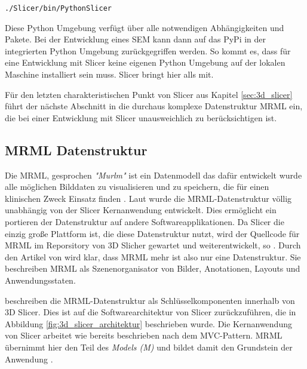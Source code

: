 \begin{center}
	\texttt{./Slicer/bin/PythonSlicer}
\end{center}

Diese Python Umgebung verfügt über alle notwendigen Abhängigkeiten und Pakete.
Bei der Entwicklung eines \ac{SEM} kann dann auf das \ac{PyPi} in der
integrierten Python Umgebung zurückgegriffen werden. So kommt es, dass für eine
Entwicklung mit Slicer keine eigenen Python Umgebung auf der lokalen Maschine
installiert sein muss. Slicer bringt hier alls mit.

Für den letzten charakteristischen Punkt von Slicer aus Kapitel \ref{sec:3d_slicer}
führt der nächste Abschnitt in die durchaus komplexe Datenstruktur \ac{MRML} ein,
die bei einer Entwicklung mit Slicer unausweichlich zu berücksichtigen ist.

\subsection{MRML Datenstruktur}
\label{subsec:mrml_datenstruktur} Die \ac{MRML}, gesprochen \textit{"Murlm"} ist
ein Datenmodell das dafür entwickelt wurde alle möglichen Bilddaten zu
visualisieren und zu speichern, die für einen klinischen Zweck Einsatz finden \citep[vgl.][]{slicer2024}.
Laut \citet{slicer2024} wurde die \ac{MRML}-Datenstruktur völlig unabhängig von der
Slicer Kernanwendung entwickelt. Dies ermöglicht ein portieren der Datenstruktur
auf andere Softwareapplikationen. Da Slicer die einzig große Plattform ist, die
diese Datenstruktur nutzt, wird der Quellcode für \ac{MRML} im Reporsitory von
3D Slicher gewartet und weiterentwickelt, so \citet{slicer2024}. Durch den Artikel
von \citet[Seite 1327]{fedorov2012slicer} wird klar, dass \ac{MRML} mehr ist also
nur eine Datenstruktur. Sie beschreiben \ac{MRML} als Szenenorganisator von Bilder,
Anotationen, Layouts und Anwendungsstaten.

\citet[Seite 1331]{fedorov2012slicer} beschreiben die \ac{MRML}-Datenstruktur
als Schlüsselkomponenten innerhalb von 3D Slicer. Dies ist auf die Softwarearchitektur
von Slicer zurückzuführen, die in Abbildung \ref{fig:3d_slicer_architektur}
beschrieben wurde. Die Kernanwendung von Slicer arbeitet wie bereits beschrieben
nach dem \ac{MVC}-Pattern. \ac{MRML} übernimmt hier den Teil des \textit{Models
(M)} und bildet damit den Grundstein der Anwendung \citep[vgl.][Seite 1332]{fedorov2012slicer}.

